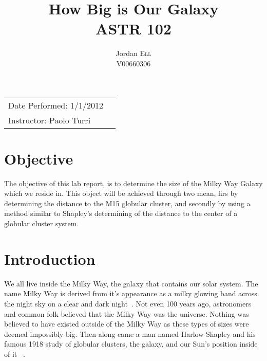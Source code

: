 \documentclass{article}
\title{How Big is Our Galaxy \\ ASTR 102} %
\author{Jordan \textsc{Ell} \\ V00660306} %
\begin{document}
\maketitle %

\begin{tabular}{lr}
Date Performed: 1/1/2012\\ %
Instructor: Paolo Turri %
\end{tabular}

\setlength\parindent{0pt} %

\renewcommand{\labelenumi}{\alph{enumi}.} %


\section{Objective}

The objective of this lab report, is to determine the size of the Milky Way Galaxy which
we reside in. This object will be achieved through two mean, firs by determining the 
distance to the M15 globular cluster, and secondly by using a method similar to Shapley's
determining of the distance to the center of a globular cluster system.
 

\section{Introduction}

We all live inside the Milky Way, the galaxy that contains our solar system. The name
Milky Way is derived from it's appearance as a milky glowing band across the night
sky on a clear and dark night~\cite{encyc:2012}. Not even 100 years ago, astronomers
and common folk believed that the Milky Way was the universe. Nothing was believed
to have existed outside of the Milky Way as these types of sizes were deemed 
impossibly big. Then along came a man named Harlow Shapley and his famous 1918
study of globular clusters, the galaxy, and our Sun's position inside of it
~\cite{Bart:1972}. \\
\end{document}
